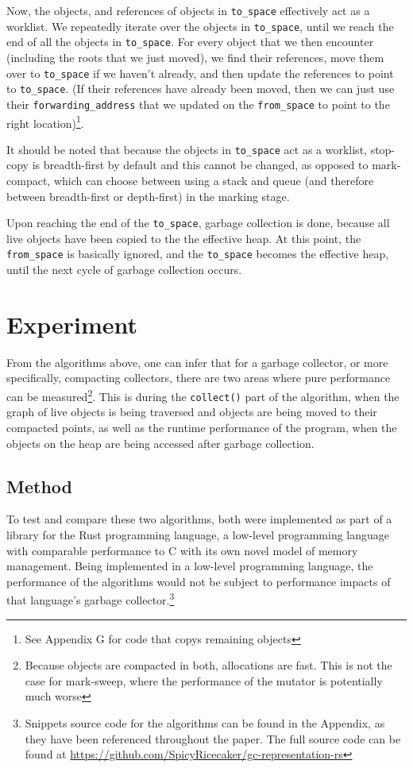 \documentclass[index]{subfiles}
\begin{document}
Now, the objects, and references of objects in \verb+to_space+ effectively act as a worklist. We repeatedly iterate over the objects in \verb+to_space+, until we reach the end of all the objects in \verb+to_space+. For every object that we then encounter (including the roots that we just moved), we find their references, move them over to \verb+to_space+ if we haven't already, and then update the references to point to \verb+to_space+. (If their references have already been moved, then we can just use their \verb+forwarding_address+ that we updated on the \verb+from_space+ to point to the right location)\footnote{See Appendix G for code that copys remaining objects}.

It should be noted that because the objects in \verb+to_space+ act as a worklist, stop-copy is breadth-first by default and this cannot be changed, as opposed to mark-compact, which can choose between using a stack and queue (and therefore between breadth-first or depth-first) in the marking stage.

Upon reaching the end of the \verb+to_space+, garbage collection is done, because all live objects have been copied to the the effective heap. At this point, the \verb+from_space+ is basically ignored, and the \verb+to_space+ becomes the effective heap, until the next cycle of garbage collection occurs.

\section{Experiment}

From the algorithms above, one can infer that for a garbage collector, or more specifically, compacting collectors, there are two areas where pure performance can be measured\footnote{Because objects are compacted in both, allocations are fast. This is not the case for mark-sweep, where the performance of the mutator is potentially much worse}. This is during the \verb+collect()+ part of the algorithm, when the graph of live objects is being traversed and objects are being moved to their compacted points, as well as the runtime performance of the program, when the objects on the heap are being accessed after garbage collection.

\subsection{Method}

To test and compare these two algorithms, both were implemented as part of a library for the Rust programming language, a low-level programming language with comparable performance to C with its own novel model of memory management. Being implemented in a low-level programming language, the performance of the algorithms would not be subject to performance impacts of that language's garbage collector.\footnote{Snippets source code for the algorithms can be found in the Appendix, as they have been referenced throughout the paper. The full source code can be found at \href{https://github.com/SpicyRicecaker/gc-representation-rs}{https://github.com/SpicyRicecaker/gc-representation-rs}}
\end{document}
